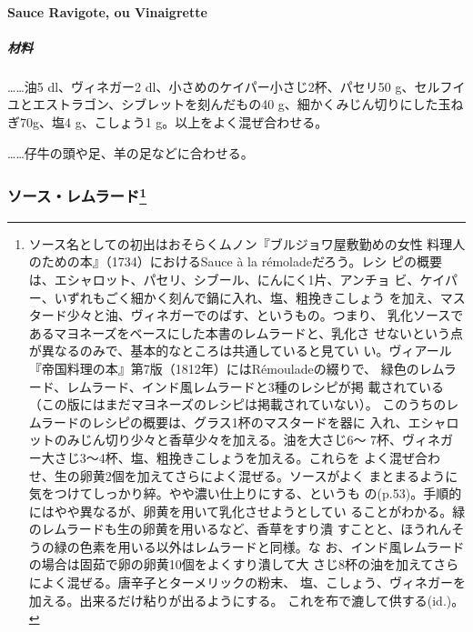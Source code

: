 \begin{recette}
\hypertarget{sauce-ravigote-froide}{%
\paragraph{Sauce Ravigote, ou Vinaigrette}\label{sauce-ravigote-froide}}


\hypertarget{ux6750ux6599}{%
\subparagraph{材料}\label{ux6750ux6599}}

\ldots{}\ldots{}油5 dl、ヴィネガー2
dl、小さめのケイパー小さじ2杯、パセリ50
g、セルフイユとエストラゴン、シブレットを刻んだもの40
g、細かくみじん切りにした玉ねぎ70g、塩4 g、こしょう1
g。以上をよく混ぜ合わせる。

\ldots{}\ldots{}仔牛の頭や足、羊の足などに合わせる。

\maeaki

\hypertarget{ux30bdux30fcux30b9ux30ecux30e0ux30e9ux30fcux30c934}{%
\subsubsection[ソース・レムラード]{\texorpdfstring{ソース・レムラード\footnote{ソース名としての初出はおそらくムノン『ブルジョワ屋敷勤めの女性
  料理人のための本』（1734）におけるSauce à la rémoladeだろう。レシ
  ピの概要は、エシャロット、パセリ、シブール、にんにく1片、アンチョ
  ビ、ケイパー、いずれもごく細かく刻んで鍋に入れ、塩、粗挽きこしょう
  を加え、マスタード少々と油、ヴィネガーでのばす、というもの。つまり、
  乳化ソースであるマヨネーズをベースにした本書のレムラードと、乳化さ
  せないという点が異なるのみで、基本的なところは共通していると見てい
  い。ヴィアール『帝国料理の本』第7版（1812年）にはRémouladeの綴りで、
  緑色のレムラード、レムラード、インド風レムラードと3種のレシピが掲
  載されている（この版にはまだマヨネーズのレシピは掲載されていない）。
  このうちのレムラードのレシピの概要は、グラス1杯のマスタードを器に
  入れ、エシャロットのみじん切り少々と香草少々を加える。油を大さじ6〜
  7杯、ヴィネガー大さじ3〜4杯、塩、粗挽きこしょうを加える。これらを
  よく混ぜ合わせ、生の卵黄2個を加えてさらによく混ぜる。ソースがよく
  まとまるように気をつけてしっかり綷。やや濃い仕上りにする、というも
  の(p.53)。手順的にはやや異なるが、卵黄を用いて乳化させようとしてい
  ることがわかる。緑のレムラードも生の卵黄を用いるなど、香草をすり潰
  すことと、ほうれんそうの緑の色素を用いる以外はレムラードと同様。な
  お、インド風レムラードの場合は固茹で卵の卵黄10個をよくすり潰して大
  さじ8杯の油を加えてさらによく混ぜる。唐辛子とターメリックの粉末、
  塩、こしょう、ヴィネガーを加える。出来るだけ粘りが出るようにする。
  これを布で漉して供する(id.)。}}{ソース・レムラード}}\label{ux30bdux30fcux30b9ux30ecux30e0ux30e9ux30fcux30c934}}


\end{recette}
